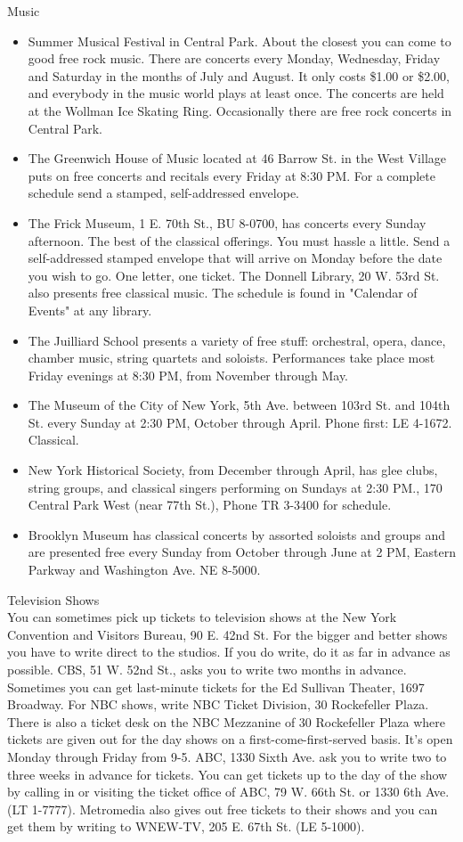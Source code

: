 \documentclass[11pt,twoside,a4paper]{book}
\begin{document}
Music
\begin{itemize}
\item Summer Musical Festival in Central Park. About the closest you can come to good free rock music. There are concerts every Monday, Wednesday, Friday and Saturday in the months of July and August. It only costs \$1.00 or \$2.00, and everybody in the music world plays at least once. The concerts are held at the Wollman Ice Skating Ring. Occasionally there are free rock concerts in Central Park. 
\item The Greenwich House of Music located at 46 Barrow St. in the West Village puts on free concerts and recitals every Friday at 8:30 PM. For a complete schedule send a stamped, self-addressed envelope. 
\item The Frick Museum, 1 E. 70th St., BU 8-0700, has concerts every Sunday afternoon. The best of the classical offerings. You must hassle a little. Send a self-addressed stamped envelope that will arrive on Monday before the date you wish to go. One letter, one ticket. The Donnell Library, 20 W. 53rd St. also presents free classical music. The schedule is found in "Calendar of Events" at any library. 
\item The Juilliard School presents a variety of free stuff: orchestral, opera, dance, chamber music, string quartets and soloists. Performances take place most Friday evenings at 8:30 PM, from November through May. 
\item The Museum of the City of New York, 5th Ave. between 103rd St. and 104th St. every Sunday at 2:30 PM, October through April. Phone first: LE 4-1672. Classical.
\item New York Historical Society, from December through April, has glee clubs, string groups, and classical singers performing on Sundays at 2:30 PM., 170 Central Park West (near 77th St.), Phone TR 3-3400 for schedule. 
\item Brooklyn Museum has classical concerts by assorted soloists and groups and are presented free every Sunday from October through June at 2 PM, Eastern Parkway and Washington Ave. NE 8-5000.
\end{itemize}

Television Shows~\\
You can sometimes pick up tickets to television shows at the New York Convention and Visitors Bureau, 90 E. 42nd St. For the bigger and better shows you have to write direct to the studios. If you do write, do it as far in advance as possible. CBS, 51 W. 52nd St., asks you to write two months in advance. Sometimes you can get last-minute tickets for the Ed Sullivan Theater, 1697 Broadway. For NBC shows, write NBC Ticket Division, 30 Rockefeller Plaza. There is also a ticket desk on the NBC Mezzanine of 30 Rockefeller Plaza where tickets are given out for the day shows on a first-come-first-served basis. It's open Monday through Friday from 9-5. ABC, 1330 Sixth Ave. ask you to write two to three weeks in advance for tickets. You can get tickets up to the day of the show by calling in or visiting the ticket office of ABC, 79 W. 66th St. or 1330 6th Ave. (LT 1-7777). Metromedia also gives out free tickets to their shows and you can get them by writing to WNEW-TV, 205 E. 67th St. (LE 5-1000).~\\
\end{document}
